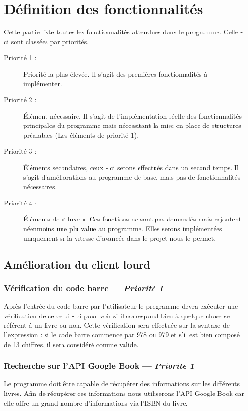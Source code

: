 \part{Définition des fonctionnalités}
Cette partie liste toutes les fonctionnalités attendues dans le programme. Celle - ci sont classées par priorités.

\begin{description}
\item [Priorité 1 :]
	Priorité la plus élevée. Il s'agit des premières fonctionnalités à implémenter.

\item [Priorité 2 :]
	Élément nécessaire. Il s'agit de l'implémentation réelle des fonctionnalités principales du programme mais nécessitant la mise en place de structures préalables (Les éléments de priorité 1). 

\item [Priorité 3 :]
	Éléments secondaires, ceux - ci serons effectués dans un second temps. Il s'agit d'améliorations au programme de base, mais pas de fonctionnalités nécessaires.  

\item [Priorité 4 :]
	Éléments de « luxe ». Ces fonctions ne sont pas demandés mais rajoutent néenmoins une plu value au programme. Elles serons implémentées uniquement si la vitesse d'avancée dans le projet nous le permet.
\end{description}


\chapter{Amélioration du client lourd}


\section[Vérification du code barre]{Vérification du code barre — \emph{Priorité 1}}
Après l'entrée du code barre par l'utilisateur le programme devra exécuter une vérification de ce celui - ci pour voir si il correspond bien à quelque chose se référent à un livre ou non. 
Cette vérification sera effectuée sur la syntaxe de l'expression : si le code barre commence par 978 ou 979 et s'il est bien composé de 13 chiffres, il sera considéré comme valide. 

\section[Recherche sur l'API Google book]{Recherche sur l'API Google Book — \emph{Priorité 1}}
Le programme doit être capable de récupérer des informations sur les différents livres.
Afin de récupérer ces informations nous utiliserons l'API Google Book car elle offre un grand nombre d'informations via l'ISBN du livre.

